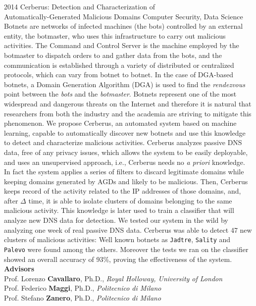 \documentclass[]{friggeri-cv} %
\begin{document}
\begin{entrylist}
\entry
{2014}
{Cerberus: Detection and Characterization of \\ Automatically-Generated Malicious Domains}
{Computer Security, Data Science}
{Botnets are networks of infected machines (the bots) controlled
by an external entity, the botmaster, who uses this infrastructure to
carry out malicious activities. The Command and Control Server is the machine
employed by the botmaster to dispatch orders to and gather data from the bots,
and the communication is established through a variety of distributed or
centralized protocols, which can vary from botnet to botnet. In the case of
DGA-based botnets, a Domain Generation Algorithm (DGA) is used to find the
\emph{rendezvous} point between the \emph{bots} and the \emph{botmaster}.
Botnets represent one of the most widespread and dangerous threats on the Internet and
therefore it is natural that researchers from both the industry and the academia
are striving to mitigate this phenomenon.
We propose Cerberus, an automated system based on machine learning, capable to automatically discover new botnets and use this
knowledge to detect and characterize malicious activities. Cerberus analyzes passive
DNS data, free of any privacy issues, which allows the system to be easily
deployable, and uses an unsupervised approach, i.e., Cerberus needs no
\emph{a priori} knowledge. In fact the system applies a series of filters to
discard legitimate domains while keeping domains generated by AGDs and likely to be malicious. Then, Cerberus
keeps record of the activity related to the IP addresses of those domains, and,
after $\Delta$ time, it is able to isolate clusters of domains belonging to the same
malicious activity. This knowledge is later used to train a classifier that will analyze
new DNS data for detection.
We tested our system in the wild by analyzing one week of real passive DNS data.
Cerberus was able to detect 47 new clusters of malicious activities: Well
known botnets as \texttt{Jadtre}, \texttt{Sality} and \texttt{Palevo} were found among the others.
Moreover the tests we ran on the classifier showed an overall accuracy of 93\%, proving
the effectiveness of the system. \\

\textbf{Advisors}\\
Prof. Lorenzo \textbf{Cavallaro}, Ph.D., \emph{Royal Holloway, University of London} \\
Prof. Federico \textbf{Maggi}, Ph.D., \emph{Politecnico di Milano} \\
Prof. Stefano \textbf{Zanero}, Ph.D., \emph{Politecnico di Milano}}
\end{entrylist}
\end{document}
